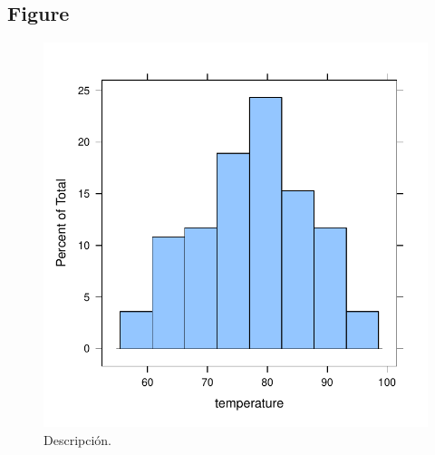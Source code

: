 \documentclass[spanish, letterpaper,12]{article}\usepackage[]{graphicx}\usepackage[]{xcolor}
\makeatletter
\def\maxwidth{ %
  \ifdim\Gin@nat@width>\linewidth
    \linewidth
  \else
    \Gin@nat@width
  \fi
}
\newenvironment{knitrout}{}{} %
\makeatother
\begin{document}
\subsection{Figure}
\label{subsec:fig}

  
  \begin{figure}[h!]
  \centering
\begin{knitrout}
\color{fgcolor}
\includegraphics[width=\maxwidth]{figure/my-label-1} 
\end{knitrout}
  \caption{\label{fig:Dname} Descripción.}
\end{figure}


\end{document}
